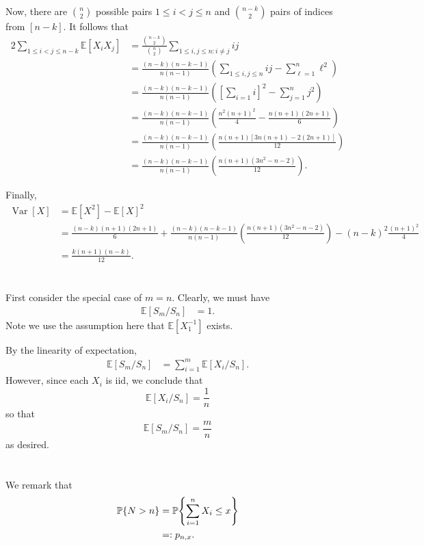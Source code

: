 \documentclass[10pt]{article}
\DeclarePairedDelimiter{\set}{\lbrace}{\rbrace}
\DeclareMathOperator{\Var}{Var}
\newcommand{\E}{\mathbb{E}}
\renewcommand{\P}{\mathbb{P}}
\begin{document}
Now,
there are $\binom{n}{2}$ possible pairs $1\leq i< j\leq n$
and $\binom{n-k}2$ pairs of indices from $[n-k]$.
It follows that
\begin{align*}
  2 \sum_{1\leq i< j\leq n-k} \E[X_i X_j]
  &= \frac{\binom{n-k}2}{\binom{n}2} \sum_{1\leq i, j\leq n: i\neq j} ij \\
  &= \frac{(n-k)(n-k-1)}{n(n-1)} \left( \sum_{1\leq i, j\leq n} ij - \sum_{\ell=1}^n \ell^2  \right) \\
  &= \frac{(n-k)(n-k-1)}{n(n-1)} \left( \left[ \sum_{i=1} i \right]^2 - \sum_{j=1}^n j^2  \right) \\
  &= \frac{(n-k)(n-k-1)}{n(n-1)} \left( \frac{n^2(n+1)^2}4 - \frac{n(n+1)(2n+1)}6  \right) \\
  &= \frac{(n-k)(n-k-1)}{n(n-1)} \left( \frac{n(n+1)[3n(n+1) - 2(2n+1)]}{12}  \right) \\
  &= \frac{(n-k)(n-k-1)}{n(n-1)} \left( \frac{n(n+1)(3n^2-n-2)}{12} \right).
\end{align*}

Finally,
\begin{align*}
  \Var[X]
  &= \E[X^2] - \E[X]^2 \\
  &= \frac{(n-k)(n+1)(2n+1)}6
  + \frac{(n-k)(n-k-1)}{n(n-1)} \left( \frac{n(n+1)(3n^2-n-2)}{12} \right)
  - (n-k)^2 \frac{(n+1)^2}4 \\
  &= \boxed{\frac{k(n+1)(n-k)}{12}}.
\end{align*}

\clearpage
\section{}
First consider the special case of $m=n$.
Clearly,
we must have
\begin{align*}
  \E[S_m / S_n]
  &= 1.
\end{align*}
Note we use the assumption here that $\E[X_1^{-1}]$ exists.

By the linearity of expectation,
\begin{align*}
  \E[S_m / S_n]
  &= \sum_{i=1}^m \E[X_i/S_n].
\end{align*}
However,
since each $X_i$ is iid,
we conclude that
\[
  \E[X_i/S_n] = \frac1n
\]
so that
\[
  \E[S_m / S_n] = \frac{m}{n}
\]
as desired.

\clearpage
\section{}
We remark that
\begin{align*}
  \P\set{N>n}
  &= \P\set*{\sum_{i=1}^n X_i \leq x} \\
  &=: p_{n, x}.
\end{align*}
\end{document}
